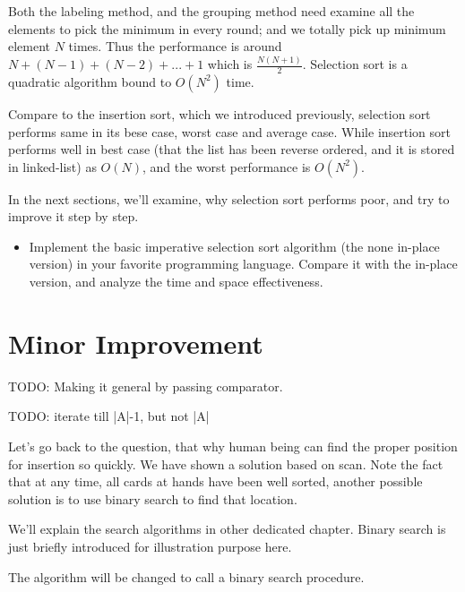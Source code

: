 \documentclass{article}
\begin{document}
Both the labeling method, and the grouping method need examine all the elements to
pick the minimum in every round; and we totally pick up minimum element $N$ times.
Thus the performance is around $N + (N-1) + (N-2) + ... + 1$ which is $\frac{N(N+1)}{2}$.
Selection sort is a quadratic algorithm bound to $O(N^2)$ time.

Compare to the insertion sort, which we introduced previously, selection sort
performs same in its bese case, worst case and average case. While insertion
sort performs well in best case (that the list has been reverse ordered, and it is stored
in linked-list) as $O(N)$, and the worst performance is $O(N^2)$. 

In the next sections, we'll examine, why selection sort performs poor, and try
to improve it step by step. 

\begin{Exercise}

\begin{itemize}
\item Implement the basic imperative selection sort algorithm (the none in-place version)
in your favorite programming language. Compare it with the in-place version, and analyze
the time and space effectiveness.
\end{itemize}

\end{Exercise}


\section{Minor Improvement}

TODO: Making it general by passing comparator.

TODO: iterate till |A|-1, but not |A|

Let's go back to the question, that why human being can find the proper
position for insertion so quickly. We have shown a solution based on scan.
Note the fact that at any time, all cards at hands have been well sorted,
another possible solution is to use binary search to find that location.

We'll explain the search algorithms in other dedicated chapter. Binary
search is just briefly introduced for illustration purpose here.

The algorithm will be changed to call a binary search procedure.
\end{document}
